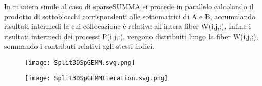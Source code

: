 In maniera simile al caso di sparseSUMMA %
si procede in parallelo calcolando il prodotto di sottoblocchi corrispondenti
alle sottomatrici di A e B, accumulando risultati intermedi la cui collocazione
è relativa all'intera fiber W(i,j,:).
Infine i risultati intermedi dei processi P(i,j,:), vengono distribuiti lungo la fiber
W(i,j,:), sommando i contributi relativi agli stessi indici.
\begin{figure}[h] 
  \caption[Split3DSpGEMM, per una risoluzione parallela di SpGEMM con un partizionamento 3D
     nel caso semplificato di una griglia di processi $\sqrt{p/c}~x~\sqrt{p/c}~x~c$]
  \centering \texttt{[image: Split3DSpGEMM.svg.png]} \decoRule \label{figCode:Split3DSpGEMM}
\end{figure}
\begin{figure}[h]
  \caption[esecuzione di un iterazione dell'algoritmo Split3DSpGEMM]
  \centering \texttt{[image: Split3DSpGEMMIteration.svg.png]} 
  \decoRule \label{fig:Split3DSpGEMMIteration}
\end{figure}














